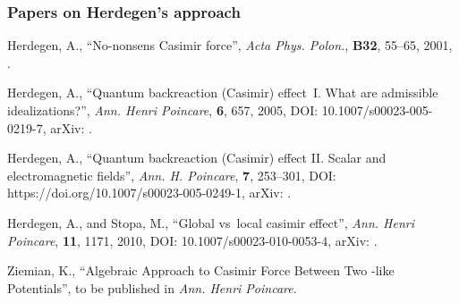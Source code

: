 \documentclass[10pt,t]{beamer}  %
\begin{document}
\begin{frame}
  \frametitle{Papers on Herdegen's approach}


  \begin{thebibliography}{99}
   Herdegen, A.,
    ``No-nonsens Casimir force'', \emph{Acta Phys. Polon.},
    \textbf{B32}, 55--65, 2001,
    .

   Herdegen, A., ``Quantum
    backreaction (Casimir) effect~I. What are admissible
    idealizations?'', \emph{Ann. Henri Poincare}, \textbf{6}, 657,
    2005, DOI: 10.1007/s00023-005-0219-7, arXiv:
    .

   Herdegen, A., ``Quantum
    backreaction (Casimir) effect II. Scalar and electromagnetic
    fields'', \emph{Ann. H. Poincare}, \textbf{7}, 253--301, DOI:
    https://doi.org/10.1007/s00023-005-0249-1, arXiv:
    .

   Herdegen, A., and Stopa,
    M., ``Global vs~local casimir effect'', \emph{Ann. Henri
      Poincare}, \textbf{11}, 1171, 2010, DOI:
    10.1007/s00023-010-0053-4, arXiv:
    .

   Ziemian, K., ``Algebraic Approach to Casimir
    Force Between Two \delta-like Potentials'', to be published in
    \emph{Ann. Henri Poincare}.

  \end{thebibliography}

\end{frame}
\end{document}
